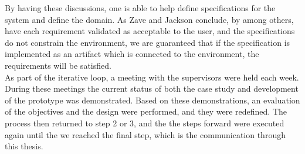 By having these discussions, one is able to help define specifications for the
system and define the domain. As Zave and Jackson \cite{zave1997four} 
conclude, by among others, have each requirement validated as acceptable to 
the user, and the specifications do not constrain the environment, we are 
guaranteed that if the specification is implemented as an artifact which
is connected to the environment, the requirements will be satisfied. \\

As part of the iterative loop, a meeting with the supervisors were held each 
week. During these meetings the current status of both the case study and
development of the prototype was demonstrated. Based on these demonstrations,
an evaluation of the objectives and the design were performed, and they were
redefined. The process then returned to step 2 or 3, and the the steps forward
were executed again until the we reached the final step, which is the
communication through this thesis.



